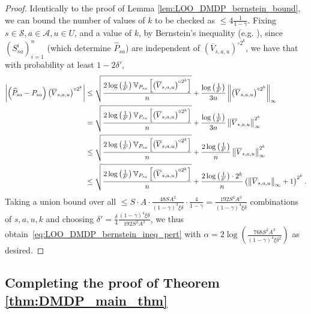 \documentclass{article}
\theoremstyle{plain}
\theoremstyle{plain}
\theoremstyle{remark}
\theoremstyle{plain}
\theoremstyle{plain}
\newcommand{\Var}{\mathbb{V}}
\newcommand{\Phat}{\widehat{P}}
\newcommand{\Vc}{\overline{V}}
\newcommand{\A}{\mathcal{A}}
\renewcommand{\S}{\mathcal{S}}
\begin{document}
\begin{proof}
    Identically to the proof of Lemma \ref{lem:LOO_DMDP_bernstein_bound}, we can bound the number of values of $k$ to be checked as $\leq 4 \frac{1}{1-\gamma}$. Fixing $s \in \S, a \in \A, u \in U$, and a value of $k$, by Bernstein's inequality (e.g. \cite[Theorem 3]{maurer_empirical_2009}), since $(S^i_{sa})_{i=1}^n$ (which determine $\Phat_{sa}$) are independent of $\left(\Vc_{s,a,u}\right)^{\circ 2^k}$, we have that with probability at least $1 - 2 \delta'$,
    \begin{align*}
        \left| \left(\Phat_{sa} - P_{sa}\right) \left( \Vc_{s,a,u} \right)^{\circ 2^k} \right|
    &\leq \sqrt{\frac{ 2\log \left(\frac{1}{\delta'} \right)   \Var_{P_{sa}} \left[ \left(\Vc_{s,a,u} \right)^{\circ 2^k}  \right]    }{n }} + \frac{  \log \left(\frac{1}{\delta'} \right)  }{3n}  \infnorm{\left(\Vc_{s,a,u} \right)^{\circ 2^k}}  \\
    &= \sqrt{\frac{ 2\log \left(\frac{1}{\delta'} \right)   \Var_{P_{sa}} \left[ \left(\Vc_{s,a,u} \right)^{\circ 2^k}  \right]    }{n }} + \frac{  \log \left(\frac{1}{\delta'} \right)  }{3n}  \infnorm{\Vc_{s,a,u}}^{2^k} \\
    & \leq \sqrt{\frac{ 2\log \left(\frac{1}{\delta'} \right)   \Var_{P_{sa}} \left[ \left(\Vc_{s,a,u} \right)^{\circ 2^k}  \right]    }{n }} + \frac{ 2 \log \left(\frac{1}{\delta'} \right)  }{n}  \infnorm{\Vc_{s,a,u}}^{2^k} \\
    &\leq \sqrt{\frac{2 \log \left(\frac{1}{\delta'} \right)  \Var_{P_{sa}} \left[ \left(\Vc_{s,a,u} \right)^{\circ 2^k}  \right]    }{n }} + \frac{ 2 \log \left(\frac{1}{\delta'} \right) \cdot 2^k }{n}  \left( \infnorm{\Vc_{s,a,u}} + 1\right)^{2^k}.
    \end{align*} 
    Taking a union bound over all $\leq S \cdot A \cdot \frac{48 SA^2}{(1-\gamma)^3 \xi \delta} \cdot \frac{4}{1-\gamma} = \frac{192 S^2A^3}{(1-\gamma)^4 \xi \delta}$ combinations of $s, a, u, k$ and choosing $\delta' = \frac{\delta}{4} \frac{(1-\gamma)^4 \xi \delta}{192 S^2A^3}$, we thus obtain~\eqref{eq:LOO_DMDP_bernstein_ineq_pert} with $\alpha = 2 \log \left(\frac{768 S^2A^3}{(1-\gamma)^4 \xi \delta^2} \right)$ as desired. 
\end{proof}

\subsection{Completing the proof of Theorem \ref{thm:DMDP_main_thm}}
\label{sec:DMDP_main_pf}
\end{document}
